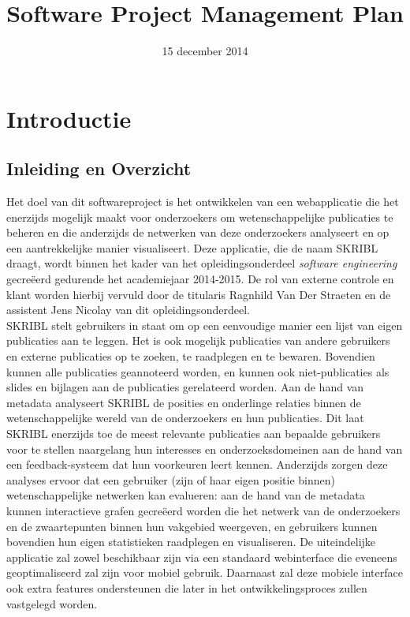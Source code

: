 \documentclass{article}
\title{Software Project Management Plan}
\author{} %
\date{15 december 2014} %
\begin{document}




\tableofcontents
\newpage








\section{Introductie}

\subsection{Inleiding en Overzicht}
Het doel van dit softwareproject is het ontwikkelen van een webapplicatie die het enerzijds mogelijk maakt voor onderzoekers om wetenschappelijke publicaties te beheren en die anderzijds de netwerken van deze onderzoekers analyseert en op een aantrekkelijke manier visualiseert. Deze applicatie, die de naam SKRIBL draagt, wordt binnen het kader van het opleidingsonderdeel \emph{software engineering} gecre\"{e}erd gedurende het academiejaar 2014-2015. De rol van externe controle en klant worden hierbij vervuld door de titularis Ragnhild Van Der Straeten en de assistent Jens Nicolay van dit opleidingsonderdeel.\newline
\\
SKRIBL stelt gebruikers in staat om op een eenvoudige manier een lijst van eigen publicaties aan te leggen. Het is ook mogelijk publicaties van andere gebruikers en externe publicaties op te zoeken, te raadplegen en te bewaren. Bovendien kunnen alle publicaties geannoteerd worden, en kunnen ook niet-publicaties als slides en bijlagen aan de publicaties gerelateerd worden. Aan de hand van metadata analyseert SKRIBL de posities en onderlinge relaties binnen de wetenschappelijke wereld van de onderzoekers en hun publicaties. Dit laat SKRIBL enerzijds toe de meest relevante publicaties aan bepaalde gebruikers voor te stellen naargelang hun interesses en onderzoeksdomeinen aan de hand van een feedback-systeem dat hun voorkeuren leert kennen. Anderzijds zorgen deze analyses ervoor dat een gebruiker (zijn of haar eigen positie binnen) wetenschappelijke netwerken kan evalueren: aan de hand van de metadata kunnen interactieve grafen gecre\"{e}erd worden die het netwerk van de onderzoekers en de zwaartepunten binnen hun vakgebied weergeven, en gebruikers kunnen bovendien hun eigen statistieken raadplegen en visualiseren. De uiteindelijke applicatie zal zowel beschikbaar zijn via een standaard webinterface die eveneens geoptimaliseerd zal zijn voor mobiel gebruik. Daarnaast zal deze mobiele interface ook extra features ondersteunen die later in het ontwikkelingsproces zullen vastgelegd worden.\newline
\end{document}
